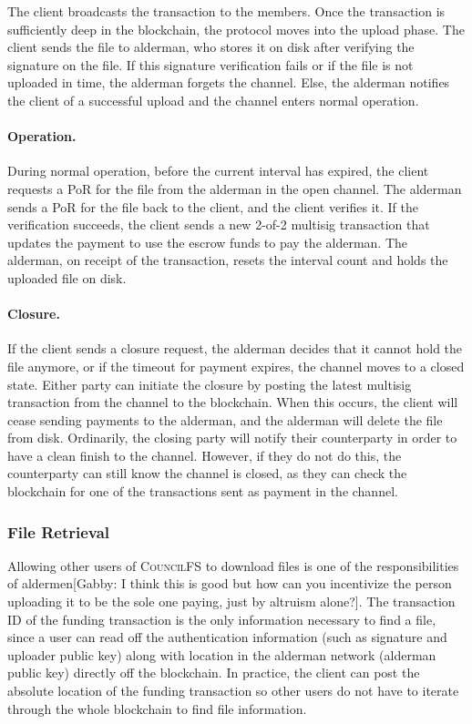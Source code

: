 \documentclass{article}
\begin{document}
The client broadcasts the transaction to the members. Once the transaction is
sufficiently deep in the blockchain, the protocol moves into the upload phase.
The client sends the file to alderman, who stores it on disk after verifying
the signature on the file. If this signature verification fails or if the file
is not uploaded in time, the alderman forgets the channel. Else, the alderman
notifies the client of a successful upload and the channel enters normal operation.

\paragraph{Operation.} During normal operation, before the current interval has
expired, the client requests a PoR for the file from the alderman in the open
channel. The alderman sends a PoR for the file back to the client, and the
client verifies it. If the verification succeeds, the client sends a new 2-of-2
multisig transaction that updates the payment to use the escrow funds to pay the
alderman. The alderman, on receipt of the transaction, resets the interval count
and holds the uploaded file on disk.

\paragraph{Closure.} If the client sends a closure request, the alderman decides
that it cannot hold the file anymore, or if the timeout for payment expires, the
channel moves to a closed state. Either party can initiate the closure by
posting the latest multisig transaction from the channel to the blockchain. When
this occurs, the client will cease sending payments to the alderman, and the
alderman will delete the file from disk. Ordinarily, the closing party will
notify their counterparty in order to have a clean finish to the channel.
However, if they do not do this, the counterparty can still know the channel is
closed, as they can check the blockchain for one of the transactions sent as
payment in the channel.

\subsubsection{File Retrieval}

Allowing other users of \textsc{CouncilFS} to download files is one of the
responsibilities of aldermen[Gabby: I think this is good but how can you incentivize the person uploading it to be the sole one paying, just by altruism alone?]. The transaction ID of the funding transaction is
the only information necessary to find a file, since a user can read off the
authentication information (such as signature and uploader public key) along
with location in the alderman network (alderman public key) directly off the
blockchain. In practice, the client can post the absolute location of the
funding transaction so other users do not have to iterate through the whole
blockchain to find file information.
\end{document}
